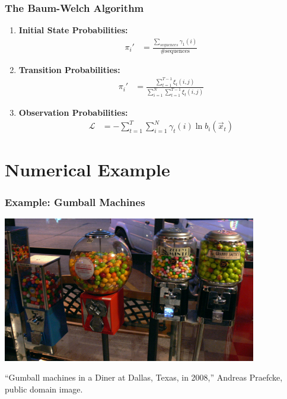 \documentclass{beamer}
\begin{document}
\begin{frame}
  \frametitle{The Baum-Welch Algorithm}

  \begin{enumerate}
  \item {\bf Initial State Probabilities:}
    \begin{align*}
      \pi_i' &=\frac{\sum_{sequences} \gamma_1(i)}{\mbox{\# sequences}}
    \end{align*}
  \item {\bf Transition Probabilities:}
    \begin{align*}
      \pi_i' &=\frac{\sum_{t=1}^{T-1} \xi_t(i,j)}{\sum_{i=1}^N\sum_{t=1}^{T-1}\xi_t(i,j)}
    \end{align*}
  \item {\bf Observation Probabilities:} 
    \begin{align*}
      {\mathcal L} &= -\sum_{t=1}^T\sum_{i=1}^N  \gamma_t(i)\ln b_{i}(\vec{x}_t)
    \end{align*}
  \end{enumerate}
\end{frame}

\section[Example]{Numerical Example}
\setcounter{subsection}{1}

\begin{frame}
  \frametitle{Example: Gumball Machines}
  \centerline{\includegraphics[height=2.5in]{Gumball_machines_Dallas_2008.jpg}}
  \begin{tiny}
    ``Gumball machines in a Diner at Dallas, Texas, in 2008,'' Andreas Praefcke, public domain image.
  \end{tiny}
\end{frame}
\end{document}
